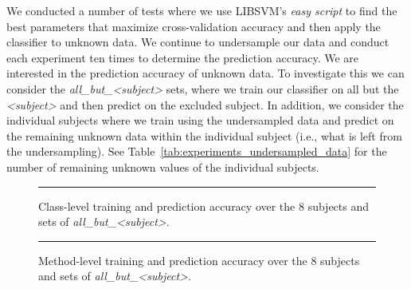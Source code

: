 We conducted a number of tests where we use LIBSVM's \emph{easy script} to find the best parameters that maximize cross-validation accuracy and then apply the classifier to unknown data. We continue to undersample our data and conduct each experiment ten times to determine the prediction accuracy. We are interested in the prediction accuracy of unknown data. To investigate this we can consider the \emph{all\_but\_<subject>} sets, where we train our classifier on all but the \emph{<subject>} and then predict on the excluded subject. In addition, we consider the individual subjects where we train using the undersampled data and predict on the remaining unknown data within the individual subject (i.e., what is left from the undersampling). See Table~\ref{tab:experiments_undersampled_data} for the number of remaining unknown values of the individual subjects.

\begin{figure}[!tb]
  \centering
  \begin{adjustbox}{max size={.95\textwidth}{.95\textheight}}
    
  \end{adjustbox}
  \caption{Class-level training and prediction accuracy over the 8 subjects and sets of \emph{all\_but\_<subject>}.}
  \vspace{2mm}
  \hrule
  \label{fig:prediction_class_graph}
\end{figure}

\begin{figure}[!tb]
  \centering
  \begin{adjustbox}{max size={.95\textwidth}{.95\textheight}}
    
  \end{adjustbox}
  \caption{Method-level training and prediction accuracy over the 8 subjects and sets of \emph{all\_but\_<subject>}.}
  \vspace{2mm}
  \hrule
  \label{fig:prediction_method_graph}
\end{figure}


